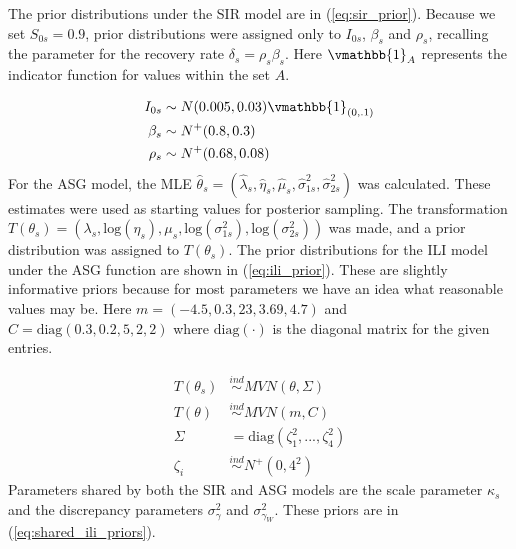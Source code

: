 The prior distributions under the SIR model are in (\ref{eq:sir_prior}). 
Because we set $S_{0s} = 0.9$, prior distributions were assigned only to 
$I_{0s}$, $\beta_s$ and $\rho_s$, recalling the parameter for the recovery 
rate $\delta_s = \rho_s \beta_s$. Here $\vmathbb{1}_{A}$ represents the 
indicator function for values within the set $A$.

\begin{equation}
\begin{aligned}
    \label{eq:sir_prior}
        I_{0s} &\sim N(0.005, 0.03) \vmathbb{1}_{(0, .1)} \\
        \beta_s &\sim N^+(0.8, 0.3) \\
        \rho_s &\sim N^+(0.68, 0.08)
\end{aligned}
\end{equation}
For the ASG model, the MLE 
$\hat{\theta}_s = (\hat{\lambda}_s, \hat{\eta}_s, \hat{\mu}_s, \hat{\sigma}_{1s}^2, \hat{\sigma}_{2s}^2)$ 
was calculated. %
These estimates were used as starting values for posterior sampling. 
The transformation 
$T(\theta_s) = (\lambda_s, \text{log}(\eta_s), \mu_s, \text{log}(\sigma_{1s}^2), \text{log}(\sigma_{2s}^2))$ 
was made, and a prior distribution was assigned to $T(\theta_s)$.
The prior distributions for the ILI model under the ASG function are shown 
in (\ref{eq:ili_prior}). These are slightly informative priors because for 
most parameters we have an idea what reasonable values may be. Here 
$m = (-4.5, 0.3, 23, 3.69, 4.7)$ and $C = \text{diag}(0.3, 0.2, 5, 2, 2)$
where $\text{diag}(\cdot)$ 
is the diagonal matrix for the given entries.


\begin{equation}
\begin{aligned}
\label{eq:ili_prior}
                T(\theta_s) &\overset{ind}{\sim} MVN(\theta, \Sigma) \\
                T(\theta) &\overset{ind}{\sim} MVN(m, C)\\
                \Sigma &= \text{diag}(\zeta^2_1,...,\zeta^2_4) \\
                \zeta_i &\overset{ind}{\sim} N^+(0,4^2)
\end{aligned}
\end{equation}
Parameters shared by both the SIR and ASG models are the scale parameter 
$\kappa_s$ and the discrepancy parameters $\sigma_{\gamma}^2$ and 
$\sigma_{\gamma_W}^2$. These priors are in (\ref{eq:shared_ili_priors}). 

